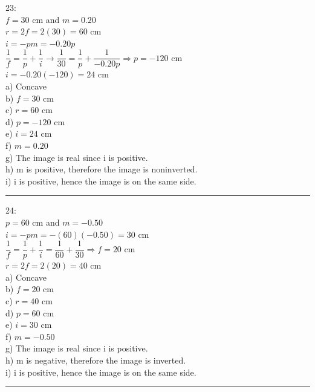 \documentclass[fleqn]{article}
\begin{document}
\begin{enumerate}
    \textcolor{hwColor}{
      23: \\
      $f=30$ cm and $m=0.20$ \\
      $r=2f=2(30)=60$ cm \\
      $i=-pm=-0.20p$ \\
      $\dfrac{1}{f}=\dfrac{1}{p}+\dfrac{1}{i} \rightarrow \dfrac{1}{30}=\dfrac{1}{p}+\dfrac{1}{-0.20p} \Longrightarrow p=-120$ cm \\
      $i=-0.20(-120)=24$ cm \\
      a) Concave \\
      b) $f=30$ cm \\
      c) $r=60$ cm \\
      d) $p=-120$ cm \\
      e) $i=24$ cm \\
      f) $m=0.20$ \\
      g) The image is real since i is positive. \\
      h) m is positive, therefore the image is noninverted. \\
      i) i is positive, hence the image is on the same side. \\
    }

    \textcolor{hwColor}{
      \rule{15cm}{0.4pt}
    }

    \textcolor{hwColor}{
      24: \\
      $p=60$ cm and $m=-0.50$ \\
      $i=-pm=-(60)(-0.50)=30$ cm \\
      $\dfrac{1}{f}=\dfrac{1}{p}+\dfrac{1}{i}=\dfrac{1}{60}+\dfrac{1}{30} \Longrightarrow f=20$ cm \\
      $r=2f=2(20)=40$ cm \\
      a) Concave \\
      b) $f=20$ cm \\
      c) $r=40$ cm \\
      d) $p=60$ cm \\
      e) $i=30$ cm \\
      f) $m=-0.50$ \\
      g) The image is real since i is positive. \\
      h) m is negative, therefore the image is inverted. \\
      i) i is positive, hence the image is on the same side. \\
    }

    \textcolor{hwColor}{
      \rule{15cm}{0.4pt}
    }


\end{enumerate}
\end{document}
